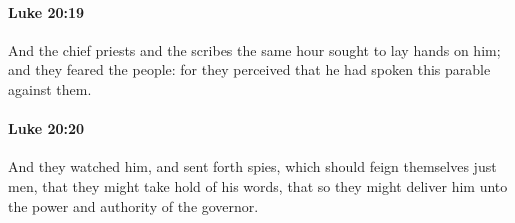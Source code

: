 		\paragraph{Luke 20:19} %
			\label{LUKE-20-19}

			And the chief priests and the scribes the same hour sought to lay hands on him; and they feared the people: for they perceived that he had spoken this parable against them.

			\begin{framed}
			\scriptsize
				\begin{compactdesc}
					\item[SBLG] 
				\end{compactdesc}
			\end{framed}

		\paragraph{Luke 20:20} %
			\label{LUKE-20-20}

			And they watched him, and sent forth spies, which should feign themselves just men, that they might take hold of his words, that so they might deliver him unto the power and authority of the governor.

